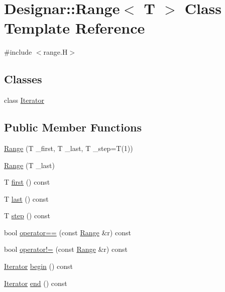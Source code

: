 \hypertarget{class_designar_1_1_range}{}\section{Designar\+:\+:Range$<$ T $>$ Class Template Reference}
\label{class_designar_1_1_range}


{\ttfamily \#include $<$range.\+H$>$}

\subsection*{Classes}
\begin{DoxyCompactItemize}
\item 
class \hyperlink{class_designar_1_1_range_1_1_iterator}{Iterator}
\end{DoxyCompactItemize}
\subsection*{Public Member Functions}
\begin{DoxyCompactItemize}
\item 
\hyperlink{class_designar_1_1_range_a45c16ed23ea9052133bd8bd1ef3542b1}{Range} (T \+\_\+first, T \+\_\+last, T \+\_\+step=T(1))
\item 
\hyperlink{class_designar_1_1_range_a2a6163d6685fc38f387c36a33ce91578}{Range} (T \+\_\+last)
\item 
T \hyperlink{class_designar_1_1_range_a2f272a5b8100003b052a77bd48f342cd}{first} () const
\item 
T \hyperlink{class_designar_1_1_range_abe2839675b48ab64073c2e74976523c7}{last} () const
\item 
T \hyperlink{class_designar_1_1_range_a831f82b8651e4b4a437aa786288b5aef}{step} () const
\item 
bool \hyperlink{class_designar_1_1_range_ac15a931a2a2de890571f85cff64f6891}{operator==} (const \hyperlink{class_designar_1_1_range}{Range} \&r) const
\item 
bool \hyperlink{class_designar_1_1_range_a736b540580449acc24fd57d4fa51897e}{operator!=} (const \hyperlink{class_designar_1_1_range}{Range} \&r) const
\item 
\hyperlink{class_designar_1_1_range_1_1_iterator}{Iterator} \hyperlink{class_designar_1_1_range_af26fe1974236b1a3ff61992986349b5f}{begin} () const
\item 
\hyperlink{class_designar_1_1_range_1_1_iterator}{Iterator} \hyperlink{class_designar_1_1_range_ab764bbefe3e28a17886e1093371d0e50}{end} () const
\end{DoxyCompactItemize}


